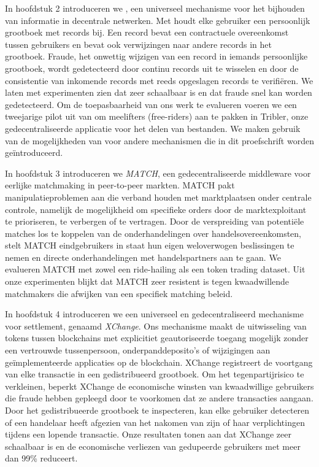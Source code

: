 {In hoofdstuk 2 introduceren we \emph{\TrustChain{}}, een universeel mechanisme voor het bijhouden van informatie in decentrale netwerken.
Met \TrustChain{} houdt elke gebruiker een persoonlijk grootboek met records bij.
Een record bevat een contractuele overeenkomst tussen gebruikers en bevat ook verwijzingen naar andere records in het grootboek.
Fraude, het onwettig wijzigen van een record in iemands persoonlijke grootboek, wordt gedetecteerd door continu records uit te wisselen en door de consistentie van inkomende records met reeds opgeslagen records te verifiëren.
We laten met experimenten zien dat \TrustChain{} zeer schaalbaar is en dat fraude snel kan worden gedetecteerd.
Om de toepasbaarheid van ons werk te evalueren voeren we een tweejarige pilot uit van \TrustChain{} om meelifters (free-riders) aan te pakken in Tribler, onze gedecentraliseerde applicatie voor het delen van bestanden.
We maken gebruik van de mogelijkheden van \TrustChain{} voor andere mechanismen die in dit proefschrift worden geïntroduceerd.

In hoofdstuk 3 introduceren we \emph{MATCH}, een gedecentraliseerde middleware voor eerlijke matchmaking in peer-to-peer markten.
MATCH pakt manipulatieproblemen aan die verband houden met marktplaatsen onder centrale controle, namelijk de mogelijkheid om specifieke orders door de marktexploitant te prioriseren, te verbergen of te vertragen.
Door de verspreiding van potentiële matches los te koppelen van de onderhandelingen over handelsovereenkomsten, stelt MATCH eindgebruikers in staat hun eigen weloverwogen beslissingen te nemen en directe onderhandelingen met handelspartners aan te gaan.
We evalueren MATCH met zowel een ride-hailing als een token trading dataset.
Uit onze experimenten blijkt dat MATCH zeer resistent is tegen kwaadwillende matchmakers die afwijken van een specifiek matching beleid.

In hoofdstuk 4 introduceren we een universeel en gedecentraliseerd mechanisme voor settlement, genaamd \emph{XChange}.
Ons mechanisme maakt de uitwisseling van tokens tussen blockchains met explicitiet geautoriseerde toegang mogelijk zonder een vertrouwde tussenpersoon, onderpanddeposito's of wijzigingen aan geïmplementeerde applicaties op de blockchain.
XChange registreert de voortgang van elke transactie in een gedistribueerd grootboek.
Om het tegenpartijrisico te verkleinen, beperkt XChange de economische winsten van kwaadwillige gebruikers die fraude hebben gepleegd door te voorkomen dat ze andere transacties aangaan.
Door het gedistribueerde grootboek te inspecteren, kan elke gebruiker detecteren of een handelaar heeft afgezien van het nakomen van zijn of haar verplichtingen tijdens een lopende transactie.
Onze resultaten tonen aan dat XChange zeer schaalbaar is en de economische verliezen van gedupeerde gebruikers met meer dan 99\% reduceert.

}
